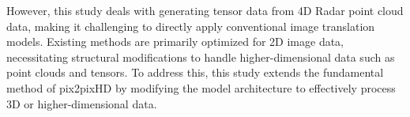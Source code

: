 However, this study deals with generating tensor data from 4D Radar point cloud data, making it challenging to directly apply conventional image translation models. Existing methods are primarily optimized for 2D image data, necessitating structural modifications to handle higher-dimensional data such as point clouds and tensors. To address this, this study extends the fundamental method of pix2pixHD by modifying the model architecture to effectively process 3D or higher-dimensional data.
